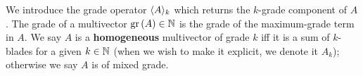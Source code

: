\begin{definition}[Grade]
	We introduce the grade operator $\langle A \rangle_{k}$ which returns the $k$-grade component of $A$.
	The grade of a multivector $\mathrm{gr}\left(A\right) \in \mathbb{N}$ is the grade of the maximum-grade term in $A$.
	We say $A$ is a \textbf{homogeneous} multivector of grade $k$ iff it is a sum of $k$-blades for a given $k \in \mathbb{N}$ (when we wish to make it explicit, we denote it $A_k$); otherwise we say $A$ is of mixed grade.
\end{definition}
